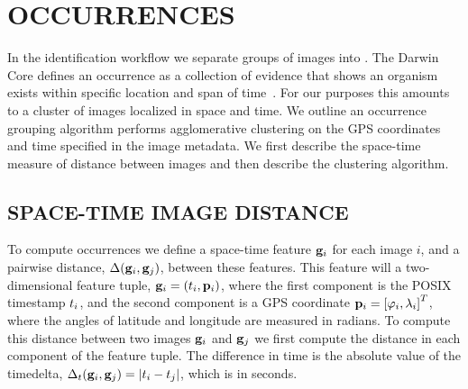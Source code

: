 \begin{comment}
fixtex --fpaths appendix.tex --outline --asmarkdown --numlines=999 --shortcite -w && ./checklang.py outline_appendix.md
\end{comment}

\appendix    %

\chapter{OCCURRENCES}\label{app:occurgroup}

    In the identification workflow we separate groups of images into .
    The Darwin Core defines an occurrence as a collection of evidence that shows an organism exists within
      specific location and span of time~\cite{wieczorek_darwin_2012}.
    For our purposes this amounts to a cluster of images localized in space and time.
    We outline an occurrence grouping algorithm performs agglomerative clustering on the GPS coordinates and time
      specified in the image metadata.
    We first describe the space-time measure of distance between images and then describe the clustering
      algorithm.

    \section{SPACE-TIME IMAGE DISTANCE}
    To compute occurrences we define a space-time feature $\mathbf{g}_i$ for each image $i$, and a pairwise distance,
      $\Delta(\mathbf{g}_i, \mathbf{g}_j)$, between these features.
    This feature will a two-dimensional feature tuple, %
    $\mathbf{g}_i = \left(t_i, \mathbf{p}_i\right)$, where the first component is the POSIX timestamp $t_i$, and the second
      component is a GPS coordinate %
    $\mathbf{p}_i = \left[\varphi_i, \lambda_i\right]^{T}$, where the angles of latitude and longitude are measured in radians.
    To compute this distance between two images $\mathbf{g}_i$ and $\mathbf{g}_j$ we first compute the distance in each component
      of the feature tuple.
    The difference in time is the absolute value of the timedelta,  %
    $\Delta_t(\mathbf{g}_i, \mathbf{g}_j) = |t_i - t_j|$, which is in seconds.

